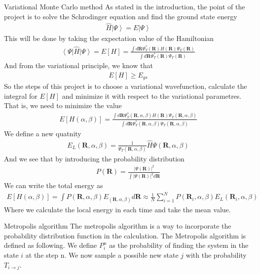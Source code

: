 \documentclass[a4paper, 12pt, titlepage]{article}
\begin{document}
\begin{section}{Variational Monte Carlo method}
   As stated in the introduction, the point of the project is to solve the Schrodinger equation and find the ground state energy
   \begin{align}
   	\hat H \left| \Psi \right> = E \left|\Psi \right> 
   \end{align}
   This will be done by taking the expectation value of the Hamiltonian
   \begin{align}
   	\left< \Psi \right| \hat H \left| \Psi \right> = E[H] = \frac{\int d \mathbf{R} \Psi^*_T(\mathbf{R}) H(\mathbf{R}) \Psi_T(\mathbf{R})}{ \int d \mathbf{R} \Psi^*_T(\mathbf{R}) \Psi_T(\mathbf{R})}
   \end{align}
 	And from the variational principle, we know that 
 	\begin{align}
 		E[H] \geq E_{gs}
 	\end{align}
 	So the steps of this project is to choose a variational wavefunction, calculate the integral for $E[H]$ and minimize it with respect to the variational parametres. That is, we need to minimize the value
 	\begin{align}
 		E[H(\alpha, \beta)] = \frac{\int d \mathbf{R} \Psi^*_T(\mathbf{R},\alpha,\beta) H(\mathbf{R}) \Psi_T(\mathbf{R},\alpha,\beta)}{ \int d \mathbf{R} \Psi^*_T(\mathbf{R},\alpha,\beta) \Psi_T(\mathbf{R},\alpha,\beta)}
 	\end{align}
 	We define a new quatnity 
 	\begin{align}
 		E_L({\mathbf{R},\alpha,\beta}) = \frac{1}{\Psi_T(\mathbf{R},\alpha,\beta)} \hat H \Psi(\mathbf{R},\alpha,\beta)
 	\end{align}
 	And we see that by introducing the probability distribution
 	\begin{align}
 		P(\mathbf{R}) = \frac{|\Psi(\mathbf{R})|^2}{\int|\Psi(\mathbf{R})|^2 d \mathbf{R}}
 	\end{align}
 	We can write the total energy as
 	\begin{align}
 		E[H(\alpha,\beta)] = \int P(\mathbf{R},\alpha,\beta) E_(\mathbf{R},\alpha,\beta) d \mathbf{R} \approx \frac{1}{N} \sum_{i=1}^N P(\mathbf{R}_i,\alpha,\beta) E_L(\mathbf{R}_i,\alpha,\beta)
 	\end{align}
 	Where we calculate the local energy in each time and take the mean value. 

 \begin{subsection}{Metropolis algorithm}
 	The metropolis algorithm is a way to incorporate the probability distribution function in the calculation. The Metropolis algorithm is defined as following. We define $P_i^n$ as the probability of finding the system in the state $i$ at the step n. 
 	We now sample a possible new state $j$ with the probability $T_{i\to j}$. 


\end{subsection}
\end{section}
\end{document}
